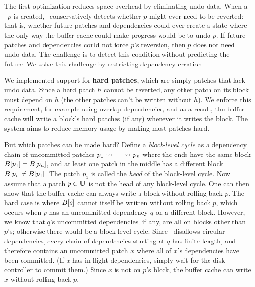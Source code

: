 
\subsection{\Nrb\ \Patches}
\label{sec:patch:nrb}

The first optimization reduces space overhead by
eliminating undo data.
%
When a \patch\ $p$ is created, \Kudos\ conservatively detects whether $p$
 might ever need to be reverted:
%
that is, whether future patches and dependencies could ever create a state
 where the only way the buffer cache could make progress would be to undo
 $p$.
%
If future patches and dependencies could not force
 $p$'s reversion, then $p$ does not need undo data.
%
The challenge is to detect this condition without predicting the future.
%
We solve this challenge by restricting dependency creation.


We implemented support for \textbf{hard patches}, which are simply patches
 that lack undo data.
%
Since a hard patch $h$ cannot be reverted, any other patch on its block
 must depend on $h$ (the other patches can't be written without $h$).
%
We enforce this requirement, for example using overlap
 dependencies, and
%
as a result, the buffer cache will write a block's hard patches (if any)
 whenever it writes the block.
%
The system aims to reduce memory usage by making most patches hard.


But which patches can be made hard?
%
Define a \emph{block-level cycle} as a dependency chain of uncommitted
 patches $p_1 \leadsto \cdots \leadsto p_n$ where the ends have the same
 block $B[{p_1}] = B[{p_n}]$, and at least one patch in the middle
 has a different block $B[{p_i}] \neq B[{p_1}]$.
%
The patch $p_1$ is called the \emph{head} of the block-level cycle.
%
Now assume that a patch $p \in \PMem$ is not the head of any block-level
 cycle.
%
One can then show that the buffer cache can always write a block without
 rolling back $p$.
%
The hard case is where $B[{p}]$ cannot itself be written without
 rolling back $p$, which occurs when $p$ has an uncommitted dependency $q$
 on a different block.
%
However, we know that $q$'s uncommitted dependencies, if any, are all on
 blocks other than $p$'s; otherwise there would be a block-level cycle.
%
Since \Featherstitch\ disallows circular dependencies, every
 chain of dependencies starting at $q$ has finite length, and therefore
 contains an uncommitted patch $x$ where all of $x$'s dependencies have
 been committed.
%
(If $x$ has in-flight dependencies, simply wait
 for the disk controller to commit them.)
%
Since $x$ is not on $p$'s block, the buffer cache can write $x$ without
 rolling back $p$.


